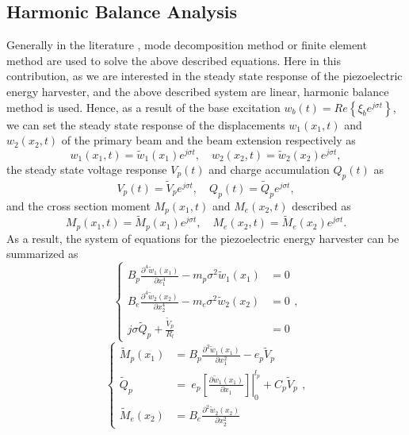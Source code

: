 \documentclass{elsarticle}
\begin{document}
\subsection{Harmonic Balance Analysis}
Generally in the literature \cite{erturk2009experimentally,park2003dynamics}, mode decomposition method or finite element method are used to solve the above described equations. Here in this contribution, as we are interested in the steady state response of the piezoelectric energy harvester, and the above described system are linear, harmonic balance method is used. Hence, as a result of the base excitation $w_b(t) = Re \left\{ \xi_b e^{j \sigma t} \right\}$, we can set the steady state response of the displacements $w_1(x_1,t)$ and $w_2(x_2,t)$ of the primary beam and the beam extension respectively as 
\begin{equation}
    w_1(x_1,t) = \tilde{w}_1(x_1)e^{j \sigma t},\quad w_2(x_2,t) = \tilde{w}_2(x_2)e^{j \sigma t},
\end{equation}
the steady state voltage response $V_p(t)$ and charge accumulation $Q_p(t)$ as
\begin{equation}
    V_p(t) = \tilde{V}_p e^{j \sigma t},\quad Q_p(t) = \tilde{Q}_p e^{j \sigma t},
\end{equation}
and the cross section moment $M_p(x_1,t)$ and $M_e(x_2,t)$ described as
\begin{equation}
    M_p(x_1,t) = \tilde{M}_p(x_1) e^{j \sigma t},\quad M_e(x_2,t) = \tilde{M}_e(x_2) e^{j \sigma t}.
\end{equation}
As a result, the system of equations for the piezoelectric energy harvester can be summarized as
\begin{equation}
    \left\{\begin{aligned}
        B_p \frac{\partial^4 \tilde{w}_1(x_1)}{\partial x_1^4} - m_p \sigma^2 \tilde{w}_1(x_1) &= 0 \\
        B_e \frac{\partial^4 \tilde{w}_2(x_2)}{\partial x_2^4} - m_e \sigma^2 \tilde{w}_2(x_2) &= 0 \\
        j \sigma \tilde{Q}_p + \frac{\tilde{V}_p}{R_l} &= 0
    \end{aligned}\right.,
    \label{eq:eq_balance_equations_original}
\end{equation}
\begin{equation}
    \left\{\begin{aligned}
        \tilde{M}_p(x_1) &= B_p \frac{\partial^2 \tilde{w}_1(x_1)}{\partial x_1^2} - e_p \tilde{V}_p \\
        \tilde{Q}_p &= \ e_p \left.\left[ \frac{\partial \tilde{w}_1(x_1)}{\partial x_1} \right]\right|^{l_p}_0 + C_p \tilde{V}_p \\
        \tilde{M}_e(x_2) &= B_e \frac{\partial^2 \tilde{w}_2(x_2)}{\partial x_2^2} 
    \end{aligned}\right.,
    \label{eq:eq_constitutive_equations_original}
\end{equation}
\end{document}
